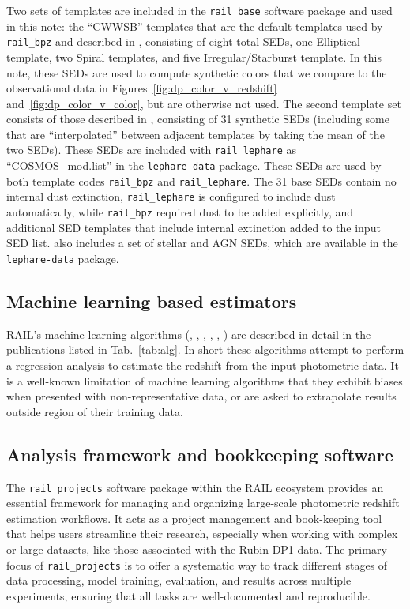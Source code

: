 Two sets of templates are included in the \texttt{rail\_base} software package and used in this note: the ``CWWSB'' templates that are the default templates used by \texttt{rail\_bpz} and described in \citet[]{Coe:06}, consisting of eight total SEDs, one Elliptical template, two Spiral templates, and five Irregular/Starburst template.  In this note, these SEDs are used to compute synthetic colors that we compare to the observational data in Figures~\ref{fig:dp_color_v_redshift} and~\ref{fig:dp_color_v_color}, but are otherwise not used.  The second template set consists of those described in \citet[]{Ilbert:09}, consisting of 31 synthetic SEDs (including some that are ``interpolated'' between adjacent templates by taking the mean of the two SEDs).  These SEDs are included with \texttt{rail\_lephare} as ``COSMOS\_mod.list'' in the \texttt{lephare-data} package.  These SEDs are used by both template codes \texttt{rail\_bpz} and \texttt{rail\_lephare}.  The 31 base SEDs contain no internal dust extinction, \texttt{rail\_lephare} is configured to include dust automatically, while \texttt{rail\_bpz} required dust to be added explicitly, and additional SED templates that include internal extinction added to the input SED list.  also includes a set of stellar and AGN SEDs, which are available in the \texttt{lephare-data} package.


\subsection{Machine learning based estimators}
\label{sec:method:machine_learning}

RAIL’s machine learning algorithms (, , , , , ) are described in detail in the publications listed in Tab.~\ref{tab:alg}.  In short these algorithms attempt to perform a regression analysis to estimate the redshift from the input photometric data.   It is a well-known limitation of machine learning algorithms that they exhibit biases when presented with non-representative data, or are asked to extrapolate results outside region of their training data.


\subsection{Analysis framework and bookkeeping software}
\label{sec:method:rail_project}

The \texttt{rail\_projects} software package within the RAIL ecosystem provides an essential framework for managing and organizing large-scale photometric redshift estimation workflows.  It acts as a project management and book-keeping tool that helps users streamline their research, especially when working with complex or large datasets, like those associated with the Rubin DP1 data.  The primary focus of \texttt{rail\_projects} is to offer a systematic way to track different stages of data processing, model training, evaluation, and results across multiple experiments, ensuring that all tasks are well-documented and reproducible.

